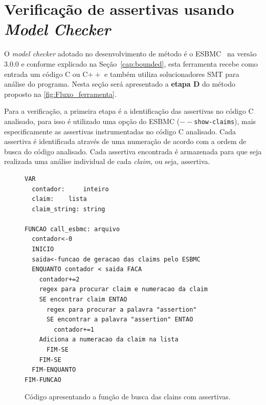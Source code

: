 \section{Verificação de assertivas usando \textit{Model Checker}}

\par
O \textit{model checker} adotado no desenvolvimento de método é o ESBMC~\cite{cordeiro2012smt} na versão $3.0.0$ e conforme explicado na Seção~\ref{cap:bounded}, esta ferramenta recebe como entrada um código C ou C$++$ e também utiliza solucionadores SMT para análise do programa. 
Nesta seção será apresentado a \textbf{etapa D} do método proposto na \autoref{fig:Fluxo_ferramenta}.

\par
Para a verificação, a primeira etapa é a identificação das assertivas no código C analisado, para isso é utilizado uma opção do ESBMC (\texttt{$--$show-claims}), mais especificamente as assertivas instrumentadas no código C analisado. Cada assertiva é identificada através de uma numeração de acordo com a ordem de busca do código analisado. Cada assertiva encontrada é armazenada para que seja realizada uma análise individual de cada \textit{claim}, ou seja,  assertiva.


\begin{figure}[H]
\caption{\label{fig:codigo_claims} Código apresentando a função de busca das clains com assertivas.}
	\begin{center}
    \begin{minipage}{0.99\textwidth}
    \begin{lstlisting}       
VAR
  contador: 	inteiro
  claim: 	lista
  claim_string: string 

FUNCAO call_esbmc: arquivo
  contador<-0
  INICIO
  saida<-funcao de geracao das claims pelo ESBMC
  ENQUANTO contador < saida FACA
    contador+=2
    regex para procurar claim e numeracao da claim
    SE encontrar claim ENTAO
      regex para procurar a palavra "assertion"
      SE encontrar a palavra "assertion" ENTAO
        contador+=1
	Adiciona a numeracao da claim na lista
      FIM-SE
    FIM-SE
  FIM-ENQUANTO
FIM-FUNCAO
    \end{lstlisting}
    \end{minipage}
	\end{center}
\end{figure}

